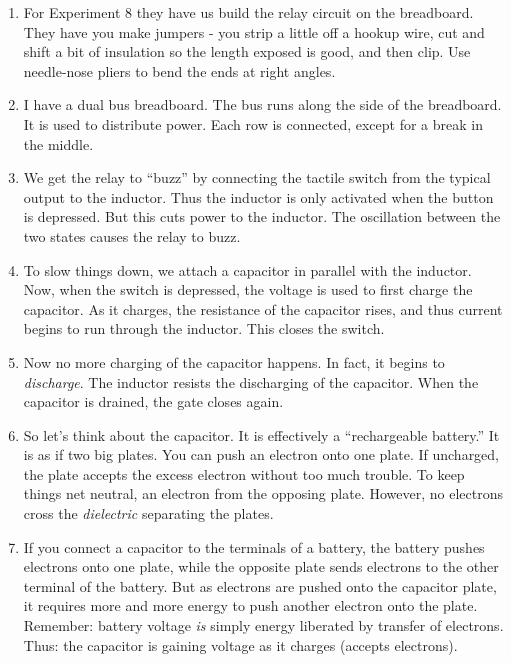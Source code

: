 \documentclass[11pt, oneside]{amsart}
\begin{document}
\begin{enumerate}
  \item For Experiment 8 they have us build the relay circuit on the
  breadboard. They have you make jumpers - you strip a little off a
  hookup wire, cut and shift a bit of insulation so the length exposed
  is good, and then clip. Use needle-nose pliers to bend the ends at
  right angles.

  \item I have a dual bus breadboard. The bus runs along the side of the
  breadboard. It is used to distribute power. Each row is connected,
  except for a break in the middle.

  \item We get the relay to ``buzz'' by connecting the tactile switch
  from the typical output to the inductor. Thus the inductor is only
  activated when the button is depressed. But this cuts power to the
  inductor. The oscillation between the two states causes the relay to
  buzz.

  \item To slow things down, we attach a capacitor in parallel with the
  inductor. Now, when the switch is depressed, the voltage is used to
  first charge the capacitor. As it charges, the resistance of the
  capacitor rises, and thus current begins to run through the inductor.
  This closes the switch.

  \item Now no more charging of the capacitor happens. In fact, it
  begins to \emph{discharge}. The inductor resists the discharging of
  the capacitor. When the capacitor is drained, the gate closes again.

  \item So let's think about the capacitor. It is effectively a
  ``rechargeable battery.'' It is as if two big plates. You can push an
  electron onto one plate. If uncharged, the plate accepts the excess
  electron without too much trouble. To keep things net neutral, an
  electron from the opposing plate. However, no electrons cross the
  \emph{dielectric} separating the plates.

  \item  If you connect a capacitor to the terminals of a battery, the
  battery pushes electrons onto one plate, while the opposite plate
  sends electrons to the other terminal of the battery. But as electrons
  are pushed onto the capacitor plate, it requires more and more energy
  to push another electron onto the plate. Remember: battery voltage
  \emph{is} simply energy liberated by transfer of electrons. Thus: the
  capacitor is gaining voltage as it charges (accepts electrons).


\end{enumerate}
\end{document}
